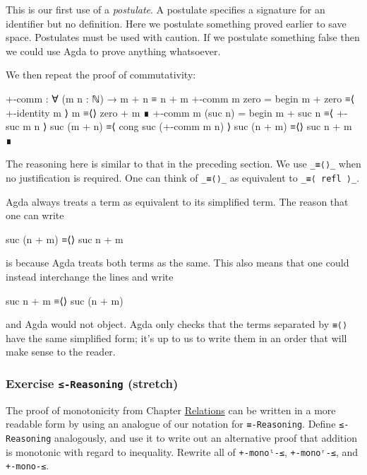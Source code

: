 This is our first use of a \emph{postulate}. A postulate specifies a
signature for an identifier but no definition. Here we postulate
something proved earlier to save space. Postulates must be used with
caution. If we postulate something false then we could use Agda to prove
anything whatsoever.

We then repeat the proof of commutativity:

\begin{fence}
\begin{code}
+-comm : ∀ (m n : ℕ) → m + n ≡ n + m
+-comm m zero =
  begin
    m + zero
  ≡⟨ +-identity m ⟩
    m
  ≡⟨⟩
    zero + m
  ∎
+-comm m (suc n) =
  begin
    m + suc n
  ≡⟨ +-suc m n ⟩
    suc (m + n)
  ≡⟨ cong suc (+-comm m n) ⟩
    suc (n + m)
  ≡⟨⟩
    suc n + m
  ∎
\end{code}
\end{fence}

The reasoning here is similar to that in the preceding section. We use
\texttt{\_≡⟨⟩\_} when no justification is required. One can think of
\texttt{\_≡⟨⟩\_} as equivalent to \texttt{\_≡⟨\ refl\ ⟩\_}.

Agda always treats a term as equivalent to its simplified term. The
reason that one can write

\begin{myDisplay}
  suc (n + m)
≡⟨⟩
  suc n + m
\end{myDisplay}

is because Agda treats both terms as the same. This also means that one
could instead interchange the lines and write

\begin{myDisplay}
  suc n + m
≡⟨⟩
  suc (n + m)
\end{myDisplay}

and Agda would not object. Agda only checks that the terms separated by
\texttt{≡⟨⟩} have the same simplified form; it's up to us to write them
in an order that will make sense to the reader.

\hypertarget{exercise--reasoning-stretch}{%
\subsubsection{\texorpdfstring{Exercise \texttt{≤-Reasoning}
(stretch)}{Exercise ≤-Reasoning (stretch)}}\label{exercise--reasoning-stretch}}

The proof of monotonicity from Chapter
\protect\hyperlink{Relations}{Relations} can be written in a more
readable form by using an analogue of our notation for
\texttt{≡-Reasoning}. Define \texttt{≤-Reasoning} analogously, and use
it to write out an alternative proof that addition is monotonic with
regard to inequality. Rewrite all of \texttt{+-monoˡ-≤},
\texttt{+-monoʳ-≤}, and \texttt{+-mono-≤}.

